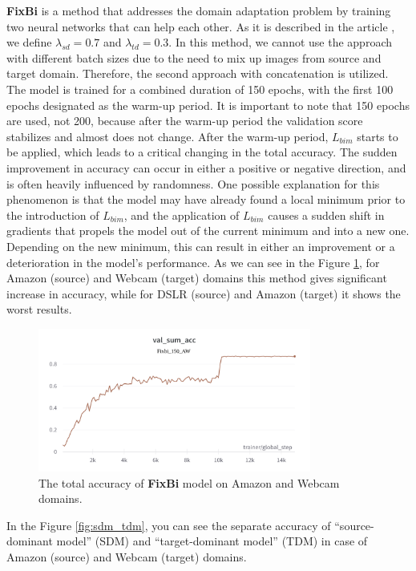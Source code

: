 \textbf{FixBi} is a method that addresses the domain adaptation problem by training two neural networks that can help each other. As it is described in the article \cite{na2021fixbi}, we define $\lambda_{sd} = 0.7$ and $\lambda_{td} = 0.3$. In this method, we cannot use the approach with different batch sizes due to the need to mix up images from source and target domain. Therefore, the second approach with concatenation is utilized. The model is trained for a combined duration of 150 epochs, with the first 100 epochs designated as the warm-up period. It is important to note that 150 epochs are used, not 200, because after the warm-up period the validation score stabilizes and almost does not change. After the warm-up period, $L_{bim}$ starts to be applied, which leads to a critical changing in the total accuracy. The sudden improvement in accuracy can occur in either a positive or negative direction, and is often heavily influenced by randomness. One possible explanation for this phenomenon is that the model may have already found a local minimum prior to the introduction of $L_{bim}$, and the application of $L_{bim}$ causes a sudden shift in gradients that propels the model out of the current minimum and into a new one. Depending on the new minimum, this can result in either an improvement or a deterioration in the model's performance. As we can see in the Figure \ref{fig:fixbi_total}, for Amazon (source) and Webcam (target) domains this method gives significant increase in accuracy, while for DSLR (source) and Amazon (target) it shows the worst results. 

\begin{figure}[H]
    \centering
    \includegraphics[width=0.8\textwidth]{Figures/Results/fixbi_total.png}
    \caption{The total accuracy of \textbf{FixBi} model on Amazon and Webcam domains.}
    \label{fig:fixbi_total}
\end{figure}

In the Figure \ref{fig:sdm_tdm}, you can see the separate accuracy of “source-dominant model” (SDM) and “target-dominant model” (TDM) in case of Amazon (source) and Webcam (target) domains.

